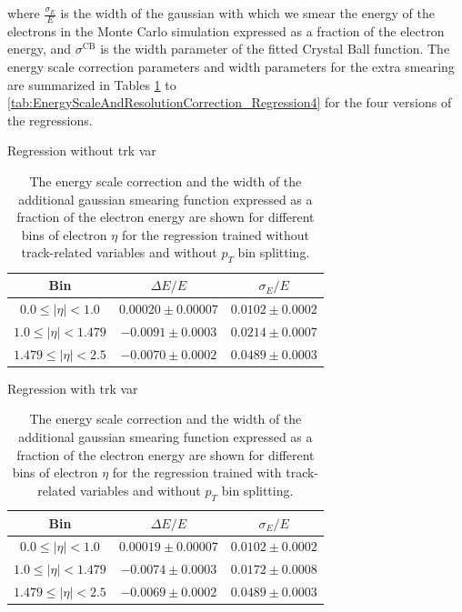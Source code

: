 \documentclass{cmspaper}
\begin{document}
where $\frac{\sigma_{E}}{E}$ is the width of the gaussian with which we smear the energy of the electrons
in the Monte Carlo simulation expressed as a fraction of the electron energy, and
$\sigma^{\mathrm{CB}}$ is the width parameter of the fitted Crystal Ball function. The energy scale
correction parameters and width parameters for the extra smearing are 
summarized in Tables \ref{tab:EnergyScaleAndResolutionCorrection_Regression1} to \ref{tab:EnergyScaleAndResolutionCorrection_Regression4}
for the four versions of the regressions.


\begin{table}[!ht]
\begin{center} 
 Regression without trk var \\
\begin{tabular}{|c|c|c|}
\hline
Bin   &   $\Delta E/E$ &   $\sigma_{E}/E$ \\  \hline
$0.0 \le |\eta| < 1.0$ & $0.00020 \pm 0.00007$ & $0.0102 \pm 0.0002$ \\\hline
$1.0 \le |\eta| < 1.479$ & $-0.0091 \pm 0.0003$ & $0.0214 \pm 0.0007$ \\\hline
$1.479 \le |\eta| < 2.5$ & $-0.0070 \pm 0.0002$ & $0.0489 \pm 0.0003$ \\\hline
\end{tabular}
\caption{The energy scale correction and the width of the additional gaussian smearing function
expressed as a fraction of the electron energy 
are shown for different bins of electron $\eta$ for the regression trained 
without track-related variables and without $p_{T}$ bin splitting. }
\label{tab:EnergyScaleAndResolutionCorrection_Regression1}
\end{center}
\end{table}


\begin{table}[!ht]
\begin{center} 
 Regression with trk var \\
\begin{tabular}{|c|c|c|}
\hline
Bin   &   $\Delta E/E$ &   $\sigma_{E}/E$ \\  \hline
$0.0 \le |\eta| < 1.0$ & $0.00019 \pm 0.00007$ & $0.0102 \pm 0.0002$ \\\hline
$1.0 \le |\eta| < 1.479$ & $-0.0074 \pm 0.0003$ & $0.0172 \pm 0.0008$ \\\hline
$1.479 \le |\eta| < 2.5$ & $-0.0069 \pm 0.0002$ & $0.0489 \pm 0.0003$ \\\hline
\end{tabular}
\caption{The energy scale correction and the width of the additional gaussian smearing function
expressed as a fraction of the electron energy 
are shown for different bins of electron $\eta$ for the regression trained 
with track-related variables and without $p_{T}$ bin splitting.}
\label{tab:EnergyScaleAndResolutionCorrection_Regression2}
\end{center}
\end{table}
\end{document}

